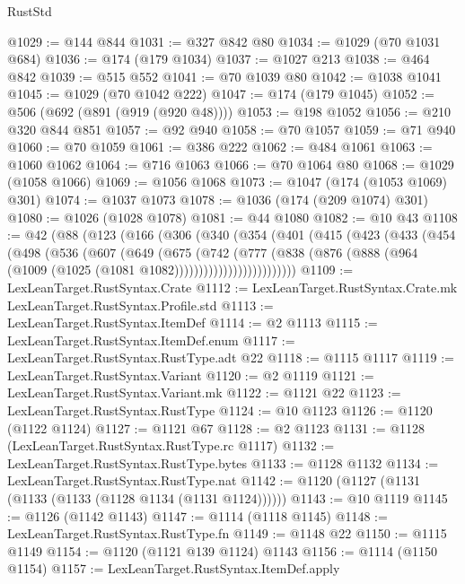 \begin{lexlean}{RustStd}
\begin{coremodule}
@1029 := @144 @844
@1031 := @327 @842 @80
@1034 := @1029 (@70 @1031 @684)
@1036 := @174 (@179 @1034)
@1037 := @1027 @213
@1038 := @464 @842
@1039 := @515 @552
@1041 := @70 @1039 @80
@1042 := @1038 @1041
@1045 := @1029 (@70 @1042 @222)
@1047 := @174 (@179 @1045)
@1052 := @506 (@692 (@891 (@919 (@920 @48))))
@1053 := @198 @1052
@1056 := @210 @320 @844 @851
@1057 := @92 @940
@1058 := @70 @1057
@1059 := @71 @940
@1060 := @70 @1059
@1061 := @386 @222
@1062 := @484 @1061
@1063 := @1060 @1062
@1064 := @716 @1063
@1066 := @70 @1064 @80
@1068 := @1029 (@1058 @1066)
@1069 := @1056 @1068
@1073 := @1047 (@174 (@1053 @1069) @301)
@1074 := @1037 @1073
@1078 := @1036 (@174 (@209 @1074) @301)
@1080 := @1026 (@1028 @1078)
@1081 := @44 @1080
@1082 := @10 @43
@1108 := @42
    (@88
      (@123
        (@166
          (@306
            (@340
              (@354
                (@401
                  (@415
                    (@423
                      (@433
                        (@454
                          (@498
                            (@536
                              (@607
                                (@649
                                  (@675
                                    (@742
                                      (@777
                                        (@838
                                          (@876
                                            (@888
                                              (@964
                                                (@1009 (@1025 (@1081 @1082)))))))))))))))))))))))))
@1109 := LexLeanTarget.RustSyntax.Crate
@1112 := LexLeanTarget.RustSyntax.Crate.mk LexLeanTarget.RustSyntax.Profile.std
@1113 := LexLeanTarget.RustSyntax.ItemDef
@1114 := @2 @1113
@1115 := LexLeanTarget.RustSyntax.ItemDef.enum
@1117 := LexLeanTarget.RustSyntax.RustType.adt @22
@1118 := @1115 @1117
@1119 := LexLeanTarget.RustSyntax.Variant
@1120 := @2 @1119
@1121 := LexLeanTarget.RustSyntax.Variant.mk
@1122 := @1121 @22
@1123 := LexLeanTarget.RustSyntax.RustType
@1124 := @10 @1123
@1126 := @1120 (@1122 @1124)
@1127 := @1121 @67
@1128 := @2 @1123
@1131 := @1128 (LexLeanTarget.RustSyntax.RustType.rc @1117)
@1132 := LexLeanTarget.RustSyntax.RustType.bytes
@1133 := @1128 @1132
@1134 := LexLeanTarget.RustSyntax.RustType.nat
@1142 := @1120 (@1127 (@1131 (@1133 (@1133 (@1128 @1134 (@1131 @1124))))))
@1143 := @10 @1119
@1145 := @1126 (@1142 @1143)
@1147 := @1114 (@1118 @1145)
@1148 := LexLeanTarget.RustSyntax.RustType.fn
@1149 := @1148 @22
@1150 := @1115 @1149
@1154 := @1120 (@1121 @139 @1124) @1143
@1156 := @1114 (@1150 @1154)
@1157 := LexLeanTarget.RustSyntax.ItemDef.apply

\end{coremodule}
\end{lexlean}
